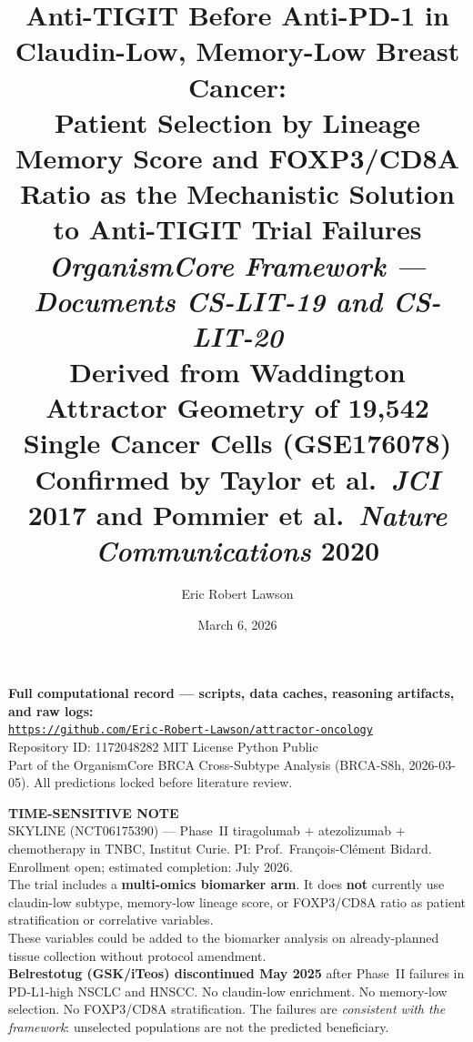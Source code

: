 \documentclass[12pt, a4paper]{article}
\title{
    \vspace{-1em}
    \textbf{Anti-TIGIT Before Anti-PD-1 in Claudin-Low,
    Memory-Low Breast Cancer:}\\[0.5em]
    \large Patient Selection by Lineage Memory Score
    and FOXP3/CD8A Ratio as the Mechanistic Solution
    to Anti-TIGIT Trial Failures\\[0.4em]
    \normalsize \textit{OrganismCore Framework ---
    Documents CS-LIT-19 and CS-LIT-20}\\[0.3em]
    \small Derived from Waddington Attractor Geometry
    of 19,542 Single Cancer Cells (GSE176078)\\[0.3em]
    \small Confirmed by Taylor et al.\ \textit{JCI} 2017
    and Pommier et al.\ \textit{Nature Communications} 2020
}
\author[1]{Eric Robert Lawson}
\affil[1]{
    OrganismCore\\
    \href{mailto:OrganismCore@proton.me}
         {OrganismCore@proton.me}\\
    ORCID:
    \href{https://orcid.org/0009-0002-0414-6544}
         {0009-0002-0414-6544}
}
\date{March 6, 2026}
\begin{document}

\maketitle
\thispagestyle{fancy}

\begin{center}
\colorbox{repobox}{
\begin{minipage}{0.88\textwidth}
\vspace{0.5em}
\centering
\textbf{Full computational record --- scripts, data
caches, reasoning artifacts, and raw logs:}\\[0.4em]
\href{https://github.com/Eric-Robert-Lawson/attractor-oncology}
{\texttt{https://github.com/Eric-Robert-Lawson/attractor-oncology}}
\\[0.3em]
\small Repository ID: 1172048282 \textbar{}
MIT License \textbar{}
Python \textbar{}
Public\\[0.2em]
Part of the OrganismCore BRCA Cross-Subtype Analysis
(BRCA-S8h, 2026-03-05).
All predictions locked before literature review.
\vspace{0.5em}
\end{minipage}}
\end{center}

\vspace{0.8em}

\begin{center}
\colorbox{urgentbox}{
\begin{minipage}{0.88\textwidth}
\vspace{0.5em}
\centering
\textbf{TIME-SENSITIVE NOTE}\\[0.4em]
\small
SKYLINE (NCT06175390) --- Phase~II tiragolumab
$+$ atezolizumab $+$ chemotherapy in TNBC, Institut
Curie. PI: Prof.\ Fran\c{c}ois-Cl\'{e}ment Bidard.
Enrollment open; estimated completion: July 2026.\\[0.3em]
The trial includes a \textbf{multi-omics biomarker arm}.
It does \textbf{not} currently use claudin-low subtype,
memory-low lineage score, or FOXP3/CD8A ratio as
patient stratification or correlative variables.\\[0.3em]
These variables could be added to the biomarker
analysis on already-planned tissue collection
without protocol amendment.\\[0.4em]
\textbf{Belrestotug (GSK/iTeos) discontinued May 2025}
after Phase~II failures in PD-L1-high NSCLC and HNSCC.
No claudin-low enrichment. No memory-low selection.
No FOXP3/CD8A stratification. The failures are
\textit{consistent with the framework}: unselected
populations are not the predicted beneficiary.
\vspace{0.5em}
\end{minipage}}
\end{center}
\end{document}
